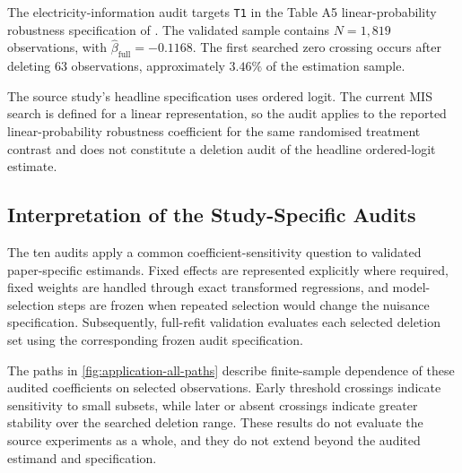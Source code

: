 \documentclass[../main.tex]{subfiles}
\begin{document}
The electricity-information audit targets \texttt{T1} in the Table A5 linear-probability robustness specification of \textcite{westberg2025power}. The validated sample contains \(N=1{,}819\) observations, with \(\widehat{\beta}_{\mathrm{full}}=-0.1168\). The first searched zero crossing occurs after deleting \(63\) observations, approximately \(3.46\%\) of the estimation sample.

The source study's headline specification uses ordered logit. The current MIS search is defined for a linear representation, so the audit applies to the reported linear-probability robustness coefficient for the same randomised treatment contrast and does not constitute a deletion audit of the headline ordered-logit estimate.



\FloatBarrier
\subsection{Interpretation of the Study-Specific Audits}
\label{app:application-interpretation-summary}

The ten audits apply a common coefficient-sensitivity question to validated paper-specific estimands. Fixed effects are represented explicitly where required, fixed weights are handled through exact transformed regressions, and model-selection steps are frozen when repeated selection would change the nuisance specification. Subsequently, full-refit validation evaluates each selected deletion set using the corresponding frozen audit specification.

The paths in \autoref{fig:application-all-paths} describe finite-sample dependence of these audited coefficients on selected observations. Early threshold crossings indicate sensitivity to small subsets, while later or absent crossings indicate greater stability over the searched deletion range. These results do not evaluate the source experiments as a whole, and they do not extend beyond the audited estimand and specification.
\end{document}
